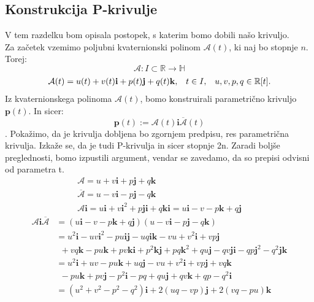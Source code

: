\documentclass[mat1]{fmfdelo}
\newcommand{\R}{\mathbb R}
\newcommand{\HH}{\mathbb H}
\newcommand{\ii}{\boldsymbol i}
\newcommand{\jj}{\boldsymbol j}
\newcommand{\kk}{\boldsymbol k}
\begin{document}
\subsection{Konstrukcija P-krivulje}
V tem razdelku bom opisala postopek, s katerim bomo dobili našo krivuljo.\\
Za začetek vzemimo poljubni kvaternionski polinom $\mathcal{A}(t)$, ki naj bo stopnje $n$. Torej:
\begin{equation*}
\mathcal{A}: I \subset \R \rightarrow \HH
\end{equation*}
\begin{equation*}
\begin{array}{c c c}
\mathcal{A}(t) = u(t) + v(t) \mathbf{i} + p(t) \mathbf{j} + q(t) \mathbf{k}, & t \in I,& u,v,p,q \in \R[t].
\end{array}
\end{equation*}
Iz kvaternionskega polinoma $\mathcal{A}(t)$, bomo konstruirali parametrično krivuljo $\mathbf{p}(t)$. In sicer:
\begin{equation}
\boldsymbol{p}(t) := \mathcal{A}(t) \boldsymbol{i} \overline{\mathcal{A}}(t)
\end{equation}.
Pokažimo, da je krivulja dobljena bo zgornjem predpisu, res parametrična krivulja. Izkaže se, da je tudi P-krivulja in sicer stopnje 2n. Zaradi boljše preglednosti, bomo izpustili argument, vendar se zavedamo, da so prepisi odvisni od parametra t.
\begin{equation*}
\begin{array}{c}
\mathcal{A} = u + v\boldsymbol{i} + p \boldsymbol{j} + q \boldsymbol{k}  \\
\overline{\mathcal{A}} = u - v\boldsymbol{i} - p \boldsymbol{j} - q \boldsymbol{k}  \\
\mathcal{A} \boldsymbol{i} = u \boldsymbol{i} + v \boldsymbol{i}^2 + p \boldsymbol{ji} + q\boldsymbol{ki} =  u \boldsymbol{i} - v - p \boldsymbol{k} + q\boldsymbol{j}	
\end{array} 
\end{equation*}
\begin{equation*}
\begin{split}
\mathcal{A}\boldsymbol{i}\overline{\mathcal{A}} & =(u\boldsymbol{i}-v-p\boldsymbol{k}+q\boldsymbol{j})(u-v\boldsymbol{i}-p\boldsymbol{j}-q\boldsymbol{k}) \\
&= u^2 \ii -uv\ii^2-pu\ii\jj - uq\ii\kk - vu + v^2\ii + vp\jj\\
&~~ +vq\kk - pu\kk + pv\kk\ii + p^2 \kk\jj + pq\kk^2 + qu\jj - qv\jj\ii - qp\jj^2 -q^2\jj\kk \\
& = u^2\ii + uv - pu\kk + uq\jj -vu+v^2\ii +vp\jj + vq\kk \\
& ~~-pu\kk+pv\jj-p^2\ii-pq+qu\jj+qv\kk+qp-q^2\ii \\
& = (u^2+v^2-p^2-q^2)\ii + 2(uq-vp)\jj +2(vq-pu)\kk
\end{split}
\end{equation*}
\end{document}

